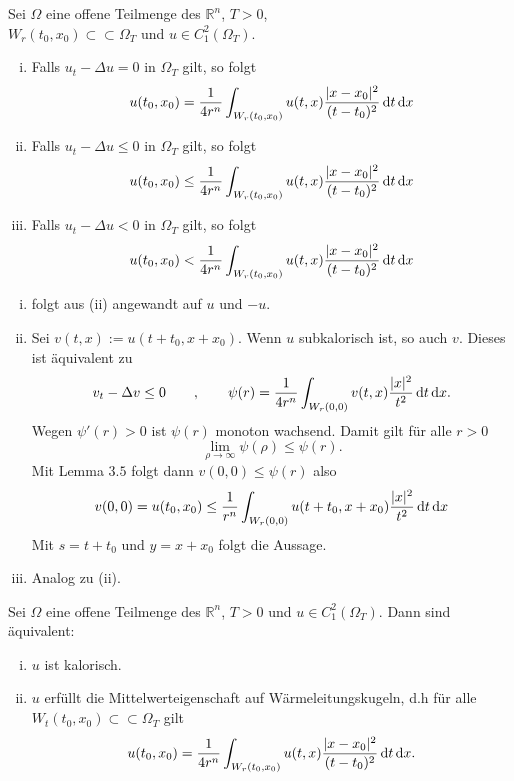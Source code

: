 
\begin{satz}[Mittelwerteigenschaft]
	Sei $\Omega$ eine offene Teilmenge des $\mathbb{R}^n$, $T >0$, \\ $W_r(t_0,x_0) \subset \subset \Omega_T$ und $u \in C^2_1(\Omega_T)$.
	\begin{enumerate}[(i)]
		\item Falls $u_t - \Delta u = 0$ in $\Omega_T$ gilt, so folgt 
		\[
			u(t_0,x_0) = \frac{1}{4r^n} \int_{W_r(t_0,x_0)}^{} u(t,x) \frac{\lvert x-x_0\rvert^2}{(t-t_0)^2} \,\mathrm{d}t \,\mathrm{d}x
		\]
		\item Falls $u_t - \Delta u \leq 0$ in $\Omega_T$ gilt, so folgt \[
			u(t_0,x_0) \leq \frac{1}{4r^n} \int_{W_r(t_0,x_0)}^{} u(t,x) \frac{\lvert x-x_0\rvert^2}{(t-t_0)^2} \,\mathrm{d}t \,\mathrm{d}x
		\] 
		\item Falls $u_t - \Delta u < 0$ in $\Omega_T$ gilt, so folgt 
		\[
			u(t_0,x_0) < \frac{1}{4r^n} \int_{W_r(t_0,x_0)}^{} u(t,x) \frac{\lvert x-x_0\rvert^2}{(t-t_0)^2} \,\mathrm{d}t \,\mathrm{d}x
		\]
	\end{enumerate}
\end{satz}
\begin{beweis}
	\begin{enumerate}[(i)]
		\item folgt aus (ii) angewandt auf $u$ und $-u$.
		\item Sei $v(t,x) := u(t+ t_0 , x +x_0)$. Wenn $u$ subkalorisch ist, so auch $v$. Dieses ist äquivalent zu 
		\[
			v_t - \Delta v \leq 0 \qquad , \qquad \psi(r) = \frac{1}{4r^n} \int_{W_r(0,0)}^{} v(t,x) \frac{\lvert x\rvert^2}{t^2} \,\mathrm{d}t \,\mathrm{d}x. 
		\]
		Wegen $\psi'(r)>0$ ist $\psi(r)$ monoton wachsend. Damit gilt für alle $r >0$
		\[
			\lim_{\rho \to \infty} \psi(\rho) \leq \psi(r).
		\]
		Mit Lemma $3.5$ folgt dann $v(0,0) \leq \psi(r)$ also
		\[
			v(0,0) = u(t_0,x_0) \leq \frac{1}{r^n} \int_{W_r(0,0)}^{} u(t+t_0,x+ x_0) \frac{\lvert x\rvert^2}{t^2} \,\mathrm{d}t \,\mathrm{d}x
		\]
		Mit $s = t+t_0$ und $y = x + x_0$ folgt die Aussage.
		\item Analog zu (ii).
	\end{enumerate}
\end{beweis}

\begin{korollar}
	Sei $\Omega$ eine offene Teilmenge des $\mathbb{R}^n$, $T>0$ und $u \in C^2_1(\Omega_T)$. Dann sind äquivalent:
	\begin{enumerate}[(i)]
		\item $u$ ist kalorisch.
		\item $u$ erfüllt die Mittelwerteigenschaft auf Wärmeleitungskugeln, d.h für alle $W_t(t_0,x_0) \subset \subset \Omega_T$ gilt
		\[
			u(t_0,x_0) = \frac{1}{4r^n} \int_{W_r(t_0,x_0)}^{} u(t,x) \frac{\lvert x-x_0\rvert^2}{(t-t_0)^2} \,\mathrm{d}t \,\mathrm{d}x.
		\]
	\end{enumerate}
\end{korollar}

